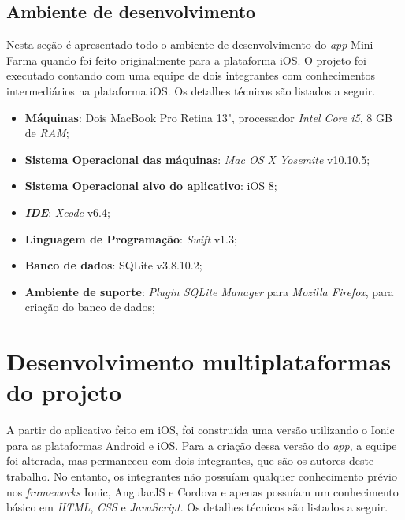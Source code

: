 \subsection{Ambiente de desenvolvimento} \label{subsec:ambientedesenvolvimento}
Nesta seção é apresentado todo o ambiente de desenvolvimento do \textit{app} Mini Farma quando foi feito originalmente para a plataforma iOS. 
O projeto foi executado contando com uma equipe de dois integrantes com conhecimentos intermediários na plataforma iOS. 
Os detalhes técnicos são listados a seguir.
\begin{itemize}
    \item \textbf{Máquinas}: Dois MacBook Pro Retina 13", processador \textit{Intel Core i5}, 8 GB de \textit{RAM};
    \item \textbf{Sistema Operacional das máquinas}: \textit{Mac OS X Yosemite} v10.10.5;
    \item \textbf{Sistema Operacional alvo do aplicativo}: iOS 8;
    \item \textbf{\textit{IDE}}: \textit{Xcode} v6.4;
    \item \textbf{Linguagem de Programação}: \textit{Swift} v1.3;
    \item \textbf{Banco de dados}: SQLite v3.8.10.2;
    \item \textbf{Ambiente de suporte}: \textit{Plugin SQLite Manager} para \textit{Mozilla Firefox}, para criação do banco de dados;
\end{itemize}

\section{Desenvolvimento multiplataformas do projeto} \label{sec:desenvolvimentomulti}

A partir do aplicativo feito em iOS, foi construída uma versão utilizando o Ionic para as plataformas Android e iOS.
Para a criação dessa versão do \textit{app}, a equipe foi alterada, mas permaneceu com dois integrantes, que são os autores deste trabalho.
No entanto, os integrantes não possuíam qualquer conhecimento prévio nos \textit{frameworks} Ionic, AngularJS e Cordova
e apenas possuíam um conhecimento básico em \textit{HTML}, \textit{CSS} e \textit{JavaScript}. Os detalhes técnicos são listados a seguir.
   
